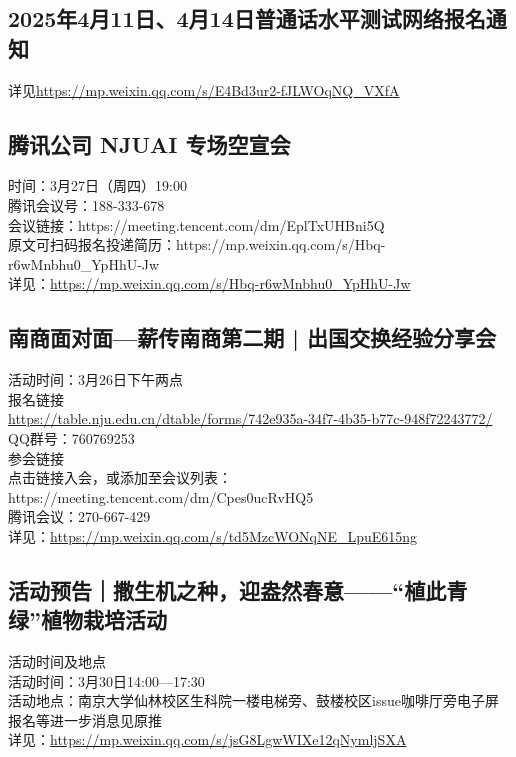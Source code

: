 \documentclass[letterpaper, 12pt]{article}
\begin{document}
\begin{multicols}{2}
\section{2025年4月11日、4月14日普通话水平测试网络报名通知}
详见\url{https://mp.weixin.qq.com/s/E4Bd3ur2-fJLWOqNQ_VXfA}

\subsection{腾讯公司 NJUAI 专场空宣会} %
时间：3月27日（周四）19:00
\\腾讯会议号：188-333-678
\\会议链接：https://meeting.tencent.com/dm/EplTxUHBni5Q
\\原文可扫码报名投递简历：https://mp.weixin.qq.com/s/Hbq-r6wMnbhu0\_YpHhU-Jw
\\详见：\url{https://mp.weixin.qq.com/s/Hbq-r6wMnbhu0_YpHhU-Jw}

\subsection{南商面对面—薪传南商第二期 | 出国交换经验分享会}
活动时间：3月26日下午两点
\\报名链接
\\\url{https://table.nju.edu.cn/dtable/forms/742e935a-34f7-4b35-b77c-948f72243772/}
\\QQ群号：760769253
\\参会链接
\\点击链接入会，或添加至会议列表：https://meeting.tencent.com/dm/Cpes0ucRvHQ5
\\腾讯会议：270-667-429
\\详见：\url{https://mp.weixin.qq.com/s/td5MzcWONqNE_LpuE615ng}

\subsection{活动预告｜撒生机之种，迎盎然春意——“植此青绿”植物栽培活动}
活动时间及地点
\\活动时间：3月30日14:00—17:30
\\活动地点：南京大学仙林校区生科院一楼电梯旁、鼓楼校区issue咖啡厅旁电子屏
\\报名等进一步消息见原推
\\详见：\url{https://mp.weixin.qq.com/s/jsG8LgwWIXe12qNymljSXA}


\end{multicols}
\end{document}
